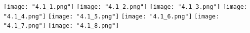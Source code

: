 \begin{center}
    \texttt{[image: "4.1\_1.png"]}
    \newpage
    \texttt{[image: "4.1\_2.png"]}
    \texttt{[image: "4.1\_3.png"]}
    \texttt{[image: "4.1\_4.png"]}
    \texttt{[image: "4.1\_5.png"]}
    \texttt{[image: "4.1\_6.png"]}
    \texttt{[image: "4.1\_7.png"]}
    \texttt{[image: "4.1\_8.png"]}
\end{center}